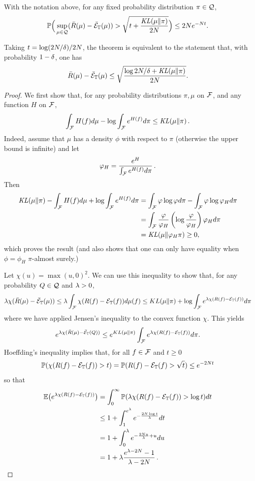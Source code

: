 \begin{theorem}
\label{th:pacb.1}
With the notation above, for any fixed probability distribution $\pi\in{\mathcal Q}$, 
\begin{equation}
\label{eq:pacb.1}
\bm{\mathbb P}\Big(\sup_{\mu\in{\mathcal Q}} (\bar R(\mu) - \bar{{\mathcal E}}_{{\mathbb T}}(\mu)) > \sqrt{t + \frac{\mathit{KL}(\mu\|\pi)}{2N}}\Big) \leq 2Ne^{-Nt}.
\end{equation}
\end{theorem}
Taking $t = \log(2N/\delta)/2N$, the theorem is equivalent to the statement that, with probability $1-\delta$, one has
\begin{equation}
\label{eq:pacb.2}
\bar R(\mu) - \bar{{\mathcal E}}_{{\mathbb T}}(\mu) \leq \sqrt{\frac{\log{2N/\delta} + \mathit{KL}(\mu\|\pi)}{2N}}.
\end{equation}
\begin{proof}
We first show that, for any probability distributions $\pi,\mu$ on ${\mathcal F}$, and any function $H$ on ${\mathcal F}$, 
\[
\int_{{\mathcal F}} H(f) d\mu - \log \int_{{\mathcal F}} e^{H(f)} d\pi \leq \mathit{KL}(\mu\|\pi)\,.
\]
Indeed, assume that $\mu$ has a density $\phi$ with respect to $\pi$ (otherwise the upper bound is infinite) and let 
\[
\varphi_H = \frac{e^{H}}{\int_{{\mathcal F}} e^{H(f)} d\pi}\,.
\]
Then 
\begin{align*}
\mathit{KL}(\mu\|\pi) - \int_{{\mathcal F}} H(f) d\mu + \log \int_{{\mathcal F}} e^{H(f)} d\pi &= \int_{{\mathcal F}} \varphi\log\varphi d\pi - \int_{\mathcal F} \varphi \log\varphi_H d\pi\\
& = \int_{{\mathcal F}} \frac{\varphi}{\varphi_H} \left(\log \frac{\varphi}{\varphi_H} \right) \varphi_H d\pi\\
&= \mathit{KL}(\mu\|\varphi_H \pi) \geq 0,
\end{align*}
which proves the result (and also shows that one can only have equality when $\phi = \phi_H$ $\pi$-almost surely.)

Let $\chi(u) = \max(u,0)^2$. We can use this inequality to show that, for any probability $Q\in {\mathcal Q}$ and $\lambda>0$,
\[
\lambda \chi(\bar R(\mu) - \bar{{\mathcal E}}_{{\mathbb T}}(\mu)) \leq \lambda\int_{{\mathcal F}} \chi(R(f) - {\mathcal E}_{\mathbb T}(f)) d\mu(f) \leq KL(\mu\|\pi) + \log \int_{{\mathcal F}} e^{\lambda \chi(R(f)-{\mathcal E}_{\mathbb T}(f))} d\pi
\]
where we have applied Jensen's inequality to the convex function $\chi$.
This yields
\[
e^{\lambda \chi(\bar R(\mu) - \bar{{\mathcal E}}_{{\mathbb T}}(Q))} \leq e^{KL(\mu\|\pi)} \int_{{\mathcal F}} e^{\lambda \chi(R(f)-{\mathcal E}_{\mathbb T}(f))} d\pi.
\]
Hoeffding's inequality implies that, for all $f\in{\mathcal F}$ and $t\geq 0$
\[
\bm{\mathbb P}(\chi(R(f)-{\mathcal E}_{\mathbb T}(f)) > t) =  \bm{\mathbb P}(R(f)-{\mathcal E}_{\mathbb T}(f) > \sqrt t) \leq e^{-2Nt}
\]
so that 
\begin{align*}
\bm{\mathbb E}\big(e^{\lambda \chi(R(f)-{\mathcal E}_{\mathbb T}(f))}\big) &=\int_0^\infty \bm{\mathbb P}(\lambda \chi(R(f)-{\mathcal E}_{\mathbb T}(f)) > \log t) dt \\
&\leq 1 + \int_1^{e^\lambda} e^{-\frac{2N\log t}{\lambda}} dt\\
& = 1 + \int_0^{\lambda} e^{-\frac{2Nu}{\lambda} +u } du\\
&= 1 +\lambda \frac{e^{\lambda - 2N}-1}{\lambda - 2N}\,.
\end{align*}


\end{proof}
